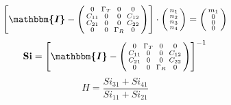 \[ \left[ \boldsymbol{\mathbbm{I}}  - \left(\begin{smallmatrix} 0 &
\Gamma_T & 0 & 0 \\ C_{11} & 0 & 0 & C_{12} \\ C_{21} & 0 & 0 & C_{22}
\\ 0 & 0 & \Gamma_R & 0 \end{smallmatrix}\right)\right] \cdot
\left(\begin{smallmatrix} n_{1} \\ n_{2} \\ n_{3} \\ n_{4}
\end{smallmatrix}\right) = \left(\begin{smallmatrix} m_{1} \\ 0 \\ 0
\\ 0 \end{smallmatrix}\right) \]
\[ \mathbf{Si} = \left[ \boldsymbol{\mathbbm{I}}  -
\left(\begin{smallmatrix} 0 & \Gamma_T & 0 & 0 \\ C_{11} & 0 & 0 &
C_{12} \\ C_{21} & 0 & 0 & C_{22} \\ 0 & 0 & \Gamma_R & 0
\end{smallmatrix}\right) \right]^{-1} \]
\[ H = \frac{ Si_{31} + Si_{41} }{ Si_{11} + Si_{21} }  \]
